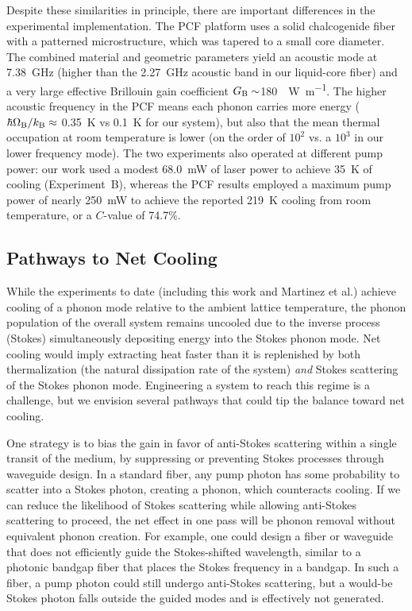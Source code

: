 Despite these similarities in principle, there are important differences in the experimental implementation. The \ac{PCF} platform uses a solid chalcogenide fiber with a patterned microstructure, which was tapered to a small core diameter. The combined material and geometric parameters yield an acoustic mode at \SI{7.38}{\giga\hertz} (higher than the \SI{2.27}{\giga\hertz} acoustic band in our liquid-core fiber) and a very large effective Brillouin gain coefficient \(G_{\rm B} \sim\)\SI{180}{\per\watt\per\meter}. The higher acoustic frequency in the \ac{PCF} means each phonon carries more energy (\(\hbar\Omega_{\rm B}/k_{\rm B} \approx\) \SI{0.35}{\kelvin} vs \SI{0.1}{\kelvin} for our system), but also that the mean thermal occupation at room temperature is lower (on the order of \(10^{2}\) vs. a \(10^{3}\) in our lower frequency mode). The two experiments also operated at different pump power: our work used a modest \SI{68.0}{\milli\watt} of laser power to achieve \SI{35}{\kelvin} of cooling (Experiment~B), whereas the \ac{PCF} results employed a maximum pump power of nearly \SI{250}{\milli\watt} to achieve the reported \SI{219}{\kelvin} cooling from room temperature, or a \(C\)-value of 74.7\%. \cite{blazquez2024optoacoustic}

\subsection{Pathways to Net Cooling}
\label{Cooling:subsec:PathwaystoNetCooling}

While the experiments to date (including this work and Martinez et al.) achieve cooling of a phonon mode relative to the ambient lattice temperature, the phonon population of the overall system remains uncooled due to the inverse process (Stokes) simultaneously depositing energy into the Stokes phonon mode. Net cooling would imply extracting heat faster than it is replenished by both thermalization (the natural dissipation rate of the system) \emph{and} Stokes scattering of the Stokes phonon mode. Engineering a system to reach this regime is a challenge, but we envision several pathways that could tip the balance toward net cooling.

One strategy is to bias the gain in favor of anti-Stokes scattering within a single transit of the medium, by suppressing or preventing Stokes processes through waveguide design. In a standard fiber, any pump photon has some probability to scatter into a Stokes photon, creating a phonon, which counteracts cooling. If we can reduce the likelihood of Stokes scattering while allowing anti-Stokes scattering to proceed, the net effect in one pass will be phonon removal without equivalent phonon creation. For example, one could design a fiber or waveguide that does not efficiently guide the Stokes-shifted wavelength, similar to a photonic bandgap fiber that places the Stokes frequency in a bandgap. In such a fiber, a pump photon could still undergo anti-Stokes scattering, but a would-be Stokes photon falls outside the guided modes and is effectively not generated.

